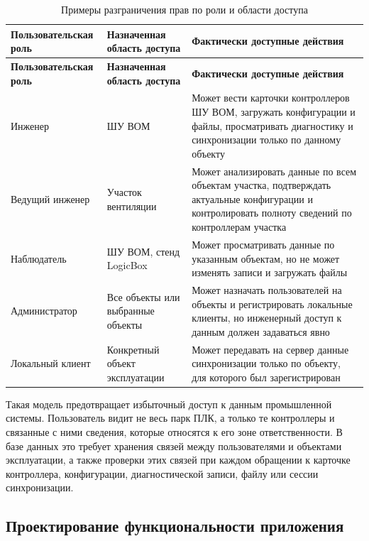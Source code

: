 \small
\begin{longtable}{|p{}|p{}|p{}|}
	\caption{Примеры разграничения прав по роли и области доступа} \label{tab:access_examples} \\
	\hline
	\textbf{Пользовательская роль} & \textbf{Назначенная область доступа} & \textbf{Фактически доступные действия} \\ \hline
	\endfirsthead
	\tabcont{\ref{tab:access_examples}}
	\textbf{Пользовательская роль} & \textbf{Назначенная область доступа} & \textbf{Фактически доступные действия} \\ \hline
	\endhead
	\hline
	\endfoot
	\hline
	\endlastfoot
	
	Инженер & ШУ ВОМ & Может вести карточки контроллеров ШУ ВОМ, загружать конфигурации и файлы, просматривать диагностику и синхронизации только по данному объекту \\ \hline
	Ведущий инженер & Участок вентиляции & Может анализировать данные по всем объектам участка, подтверждать актуальные конфигурации и контролировать полноту сведений по контроллерам участка \\ \hline
	Наблюдатель & ШУ ВОМ, стенд LogicBox & Может просматривать данные по указанным объектам, но не может изменять записи и загружать файлы \\ \hline
	Администратор & Все объекты или выбранные объекты & Может назначать пользователей на объекты и регистрировать локальные клиенты, но инженерный доступ к данным должен задаваться явно \\ \hline
	Локальный клиент & Конкретный объект эксплуатации & Может передавать на сервер данные синхронизации только по объекту, для которого был зарегистрирован \\ \hline
\end{longtable}
\normalsize

Такая модель предотвращает избыточный доступ к данным промышленной системы. Пользователь видит не весь парк ПЛК, а только те контроллеры и связанные с ними сведения, которые относятся к его зоне ответственности. В базе данных это требует хранения связей между пользователями и объектами эксплуатации, а также проверки этих связей при каждом обращении к карточке контроллера, конфигурации, диагностической записи, файлу или сессии синхронизации.

\subsection{Проектирование функциональности приложения}

